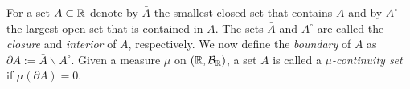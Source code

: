 %
%
%


For a set $A \subset \mathbb R$ denote by $\bar{A}$ the smallest closed set that contains $A$ and by $A^\circ$ the largest open set that is contained in $A$. The sets $\bar{A}$ and $A^\circ$ are called the \emph{closure} and \emph{interior} of $A$, respectively. We now define the \emph{boundary} of $A$ as $\partial A := \bar{A} \backslash A^\circ$. Given a measure $\mu$ on $(\mathbb R, \mathcal B_{\mathbb R})$, a set $A$ is called a \emph{$\mu$-continuity set} if $\mu(\partial A) = 0$.

